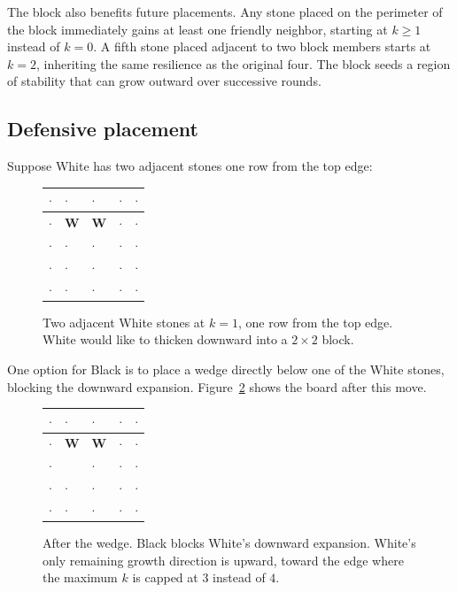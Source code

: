 The block also benefits future placements.
Any stone placed on the perimeter of the block immediately gains at least one friendly neighbor, starting at $k \geq 1$ instead of $k = 0$.
A fifth stone placed adjacent to two block members starts at $k = 2$, inheriting the same resilience as the original four.
The block seeds a region of stability that can grow outward over successive rounds.

\subsection{Defensive placement}

Suppose White has two adjacent stones one row from the top edge:

\begin{figure}[ht]
\centering
\begin{tabular}{|w{c}{1.2em}|w{c}{1.2em}|w{c}{1.2em}|w{c}{1.2em}|w{c}{1.2em}|}
\hline
$\cdot$ & $\cdot$ & $\cdot$ & $\cdot$ & $\cdot$ \\
\hline
$\cdot$ & \textbf{W} & \textbf{W} & $\cdot$ & $\cdot$ \\
\hline
$\cdot$ & $\cdot$ & $\cdot$ & $\cdot$ & $\cdot$ \\
\hline
$\cdot$ & $\cdot$ & $\cdot$ & $\cdot$ & $\cdot$ \\
\hline
$\cdot$ & $\cdot$ & $\cdot$ & $\cdot$ & $\cdot$ \\
\hline
\end{tabular}
\caption{Two adjacent White stones at $k = 1$, one row from the top edge. White would like to thicken downward into a $2 \times 2$ block.}
\label{fig:deny-stabilization}
\end{figure}

One option for Black is to place a wedge directly below one of the White stones, blocking the downward expansion.
Figure~\ref{fig:wedge-result} shows the board after this move.

\begin{figure}[ht]
\centering
\begin{tabular}{|w{c}{1.2em}|w{c}{1.2em}|w{c}{1.2em}|w{c}{1.2em}|w{c}{1.2em}|}
\hline
$\cdot$ & $\cdot$ & $\cdot$ & $\cdot$ & $\cdot$ \\
\hline
$\cdot$ & \textbf{W} & \textbf{W} & $\cdot$ & $\cdot$ \\
\hline
$\cdot$ & \textcolor{white}{\textbf{B}} & $\cdot$ & $\cdot$ & $\cdot$ \\
\hline
$\cdot$ & $\cdot$ & $\cdot$ & $\cdot$ & $\cdot$ \\
\hline
$\cdot$ & $\cdot$ & $\cdot$ & $\cdot$ & $\cdot$ \\
\hline
\end{tabular}
\caption{After the wedge. Black blocks White's downward expansion. White's only remaining growth direction is upward, toward the edge where the maximum $k$ is capped at $3$ instead of $4$.}
\label{fig:wedge-result}
\end{figure}

